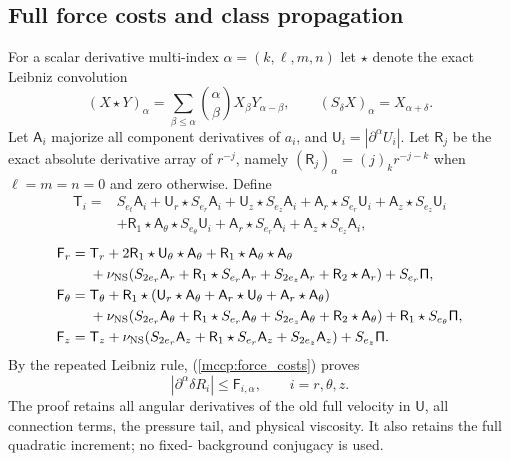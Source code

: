 \documentclass[11pt]{article}
\begin{document}
\subsection{Full force costs and class propagation}

For a scalar derivative multi-index
$\alpha=(k,\ell,m,n)$ let $\star$ denote the exact Leibniz convolution
\[
 (X\star Y)_\alpha=\sum_{\beta\le\alpha}\binom{\alpha}{\beta}
 X_\beta Y_{\alpha-\beta},\qquad
 (S_\delta X)_\alpha=X_{\alpha+\delta}.
\]
Let $\mathsf A_i$ majorize all component derivatives of $a_i$, and
$\mathsf U_i=|\partial^\alpha U_i|$. Let $\mathsf R_j$ be the exact
absolute derivative array of $r^{-j}$, namely
$(\mathsf R_j)_\alpha=(j)_k r^{-j-k}$ when $\ell=m=n=0$ and zero otherwise.
Define
\begin{equation}\label{mccp:transport_cost}
\begin{split}
 \mathsf T_i={}&S_{e_t}\mathsf A_i+\mathsf U_r\star S_{e_r}\mathsf A_i
 +\mathsf U_z\star S_{e_z}\mathsf A_i
 +\mathsf A_r\star S_{e_r}\mathsf U_i
 +\mathsf A_z\star S_{e_z}\mathsf U_i\\
 &+\mathsf R_1\star\mathsf A_\theta\star S_{e_\theta}\mathsf U_i
 +\mathsf A_r\star S_{e_r}\mathsf A_i
 +\mathsf A_z\star S_{e_z}\mathsf A_i,
\end{split}
\end{equation}
\begin{equation}\label{mccp:force_costs}
\begin{aligned}
 \mathsf F_r={}&\mathsf T_r+2\mathsf R_1\star\mathsf U_\theta\star\mathsf A_\theta
 +\mathsf R_1\star\mathsf A_\theta\star\mathsf A_\theta\\
 &+\nu_{\rm NS}(S_{2e_r}\mathsf A_r+\mathsf R_1\star S_{e_r}\mathsf A_r
 +S_{2e_z}\mathsf A_r+\mathsf R_2\star\mathsf A_r)+S_{e_r}\mathsf\Pi,\\
 \mathsf F_\theta={}&\mathsf T_\theta+\mathsf R_1\star(\mathsf U_r\star\mathsf A_\theta
 +\mathsf A_r\star\mathsf U_\theta+\mathsf A_r\star\mathsf A_\theta)\\
 &+\nu_{\rm NS}(S_{2e_r}\mathsf A_\theta+\mathsf R_1\star S_{e_r}\mathsf A_\theta
 +S_{2e_z}\mathsf A_\theta+\mathsf R_2\star\mathsf A_\theta)
 +\mathsf R_1\star S_{e_\theta}\mathsf\Pi,\\
 \mathsf F_z={}&\mathsf T_z+\nu_{\rm NS}(S_{2e_r}\mathsf A_z
 +\mathsf R_1\star S_{e_r}\mathsf A_z+S_{2e_z}\mathsf A_z)
 +S_{e_z}\mathsf\Pi.
\end{aligned}
\end{equation}
By the repeated Leibniz rule, (\ref{mccp:force_costs}) proves
\begin{equation}\label{mccp:force_bound}
 |\partial^\alpha\delta R_i|\le\mathsf F_{i,\alpha},
 \qquad i=r,\theta,z.
\end{equation}
The proof retains all angular derivatives of the old full velocity in
$\mathsf U$, all connection terms, the pressure tail, and physical
viscosity. It also retains the full quadratic increment; no fixed-
background conjugacy is used.
\end{document}
